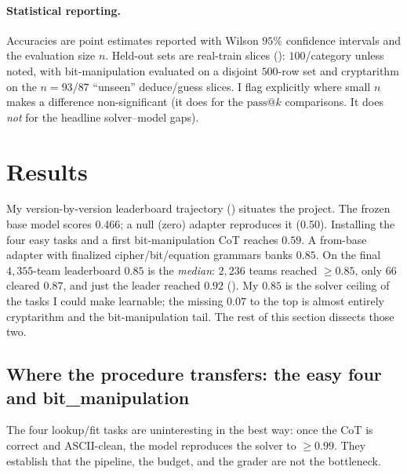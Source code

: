 \documentclass[11pt]{article}
\begin{document}
\paragraph{Statistical reporting.} Accuracies are point estimates reported with Wilson
$95\%$ confidence intervals and the evaluation size $n$. Held-out sets are real-train slices
(): $100$/category unless noted, with bit-manipulation evaluated on a
disjoint $500$-row set and cryptarithm on the $n{=}93$/$87$ ``unseen'' deduce/guess slices.
I flag explicitly where small $n$ makes a difference non-significant (it does for the
$\mathrm{pass@}k$ comparisons. It does \emph{not} for the headline solver--model gaps).

\section{Results}
\label{sec:results}

My version-by-version leaderboard trajectory () situates the project. The
frozen base model scores $0.466$; a null
(zero) adapter reproduces it ($0.50$). Installing the four easy tasks and a first
bit-manipulation CoT reaches $0.59$. A from-base adapter with finalized
cipher/bit/equation grammars banks $0.85$. On the final $4{,}355$-team leaderboard $0.85$ is
the \emph{median}: $2{,}236$ teams reached $\geq\!0.85$, only $66$ cleared $0.87$, and just
the leader reached $0.92$ (). My $0.85$ is the solver ceiling of the
tasks I could make learnable; the missing $0.07$ to the top is almost entirely cryptarithm
and the bit-manipulation tail. The rest of this section dissects those two.


\subsection{Where the procedure transfers: the easy four and bit\_manipulation}
\label{sec:res-easy}

The four lookup/fit tasks are uninteresting in the best way: once the CoT is correct and
ASCII-clean, the model reproduces the solver to $\geq\!0.99$. They establish that the
pipeline, the budget, and the grader are not the bottleneck.
\end{document}

